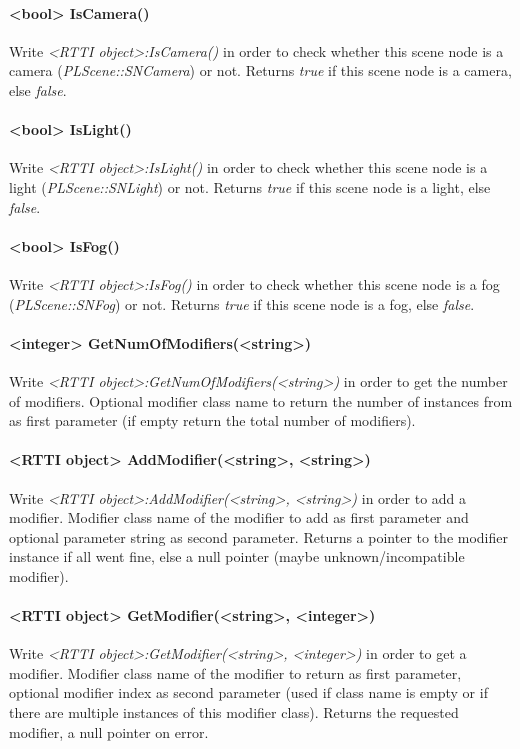 \paragraph{<bool> IsCamera()}
Write \emph{<RTTI object>:IsCamera()} in order to check whether this scene node is a camera (\emph{PLScene::SNCamera}) or not. Returns \emph{true} if this scene node is a camera, else \emph{false}.

\paragraph{<bool> IsLight()}
Write \emph{<RTTI object>:IsLight()} in order to check whether this scene node is a light (\emph{PLScene::SNLight}) or not. Returns \emph{true} if this scene node is a light, else \emph{false}.

\paragraph{<bool> IsFog()}
Write \emph{<RTTI object>:IsFog()} in order to check whether this scene node is a fog (\emph{PLScene::SNFog}) or not. Returns \emph{true} if this scene node is a fog, else \emph{false}.

\paragraph{<integer> GetNumOfModifiers(<string>)}
Write \emph{<RTTI object>:GetNumOfModifiers(<string>)} in order to get the number of modifiers. Optional modifier class name to return the number of instances from as first parameter (if empty return the total number of modifiers).

\paragraph{<RTTI object> AddModifier(<string>, <string>)}
Write \emph{<RTTI object>:AddModifier(<string>, <string>)} in order to add a modifier. Modifier class name of the modifier to add as first parameter and optional parameter string as second parameter. Returns a pointer to the modifier instance if all went fine, else a null pointer (maybe unknown/incompatible modifier).

\paragraph{<RTTI object> GetModifier(<string>, <integer>)}
Write \emph{<RTTI object>:GetModifier(<string>, <integer>)} in order to get a modifier. Modifier class name of the modifier to return as first parameter, optional modifier index as second parameter (used if class name is empty or if there are multiple instances of this modifier class). Returns the requested modifier, a null pointer on error.

